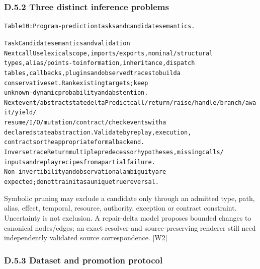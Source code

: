 \subsubsection*{D.5.2 Three distinct inference problems}


\begingroup\fontsize{7}{8.4}\selectfont
\begin{alltt}
Table 10: Program-prediction tasks and candidate semantics.
\end{alltt}\endgroup

\begingroup\fontsize{7}{8.4}\selectfont
\begin{alltt}
Task                                         Candidate semantics and validation
Next call                                    Use lexical scope, imports/exports, nominal/structural
                                             types, alias/points-to information, inheritance, dispatch
                                             tables, callbacks, plugins and observed traces to build a
                                             conservative set. Rank existing targets; keep
                                             unknown-dynamic probability and abstention.
Next event / abstract state delta            Predict call/return/raise/handle/branch/await/yield/
                                             resume/I/O/mutation/contract/check events with a
                                             declared state abstraction. Validate by replay, execution,
                                             contracts or the appropriate formal backend.
Inverse trace                                Return multiple predecessor hypotheses, missing calls/
                                             inputs and replay recipes from a partial failure.
                                             Non-invertibility and observational ambiguity are
                                             expected; do not train it as a unique true reversal.
\end{alltt}\endgroup



Symbolic pruning may exclude a candidate only through an admitted type, path, alias, effect, temporal,
resource, authority, exception or contract constraint. Uncertainty is not exclusion. A repair-delta
model proposes bounded changes to canonical nodes/edges; an exact resolver and source-preserving
renderer still need independently validated source correspondence. [W2]

\subsubsection*{D.5.3 Dataset and promotion protocol}

